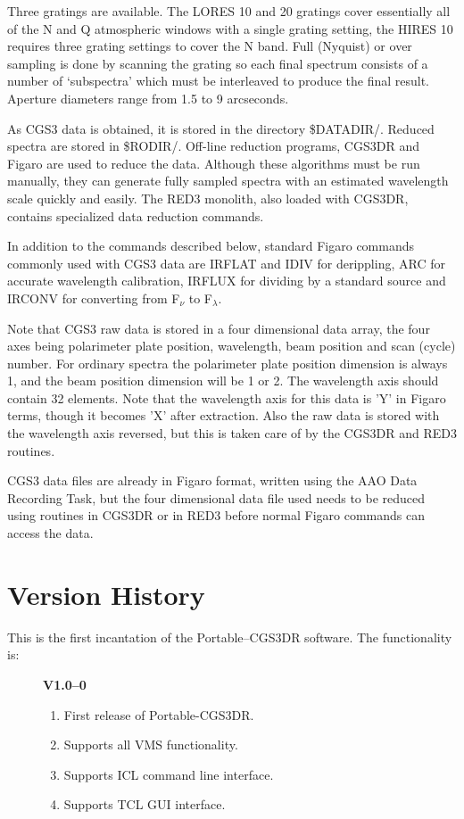 \documentclass[a4paper]{book}
\renewcommand{\_}{{\tt\char'137}}
\begin{document}
Three gratings are available. The LORES 10 and 20 gratings cover
essentially all of the N and Q atmospheric windows with a single grating
setting, the HIRES 10 requires three grating settings to cover the N band.
Full (Nyquist) or over sampling is done by scanning the grating so each
final spectrum consists of a number of `subspectra'  which must be
interleaved to produce the final result. Aperture diameters range from
1.5 to 9 arcseconds.

As CGS3 data is obtained, it is stored in the directory \$DATADIR/.
Reduced spectra are stored in \$RODIR/. Off-line reduction programs, CGS3DR
and Figaro are used to reduce the data. Although these algorithms must be run
manually, they can generate fully sampled spectra with an estimated wavelength
scale quickly and easily. The RED3 monolith, also loaded with CGS3DR, contains
specialized data reduction commands.

In addition to the commands described below, standard Figaro commands
commonly used with CGS3 data are IRFLAT and IDIV for derippling, ARC for
accurate wavelength calibration, IRFLUX for dividing by a standard source and
IRCONV for converting from F$_{\nu}$ to F$_{\lambda}$.

Note that CGS3 raw data is stored in a four dimensional data array, the
four axes being polarimeter plate position, wavelength, beam position and
scan (cycle) number. For ordinary spectra the polarimeter plate position
dimension is always 1, and the beam position dimension will be 1 or 2. The
wavelength axis should contain 32 elements. Note that the wavelength axis
for this data is 'Y' in Figaro terms, though it becomes 'X' after
extraction. Also the raw data is stored with the wavelength axis reversed,
but this is taken care of by the CGS3DR and RED3 routines.

CGS3 data files are already in Figaro format, written using the AAO Data
Recording Task, but the four dimensional data file used needs to be reduced
using routines in CGS3DR or in RED3 before normal Figaro commands can
access the data.

\section{Version History}
This is the first incantation of the Portable--CGS3DR software. The
functionality is:

\begin{description}
\item[] {\bf V1.0--0}
 \begin{enumerate}
  \item First release of Portable-CGS3DR.
  \item Supports all VMS functionality.
  \item Supports ICL command line interface.
  \item Supports TCL GUI interface.
 \end{enumerate}
\end{description}
\end{document}
